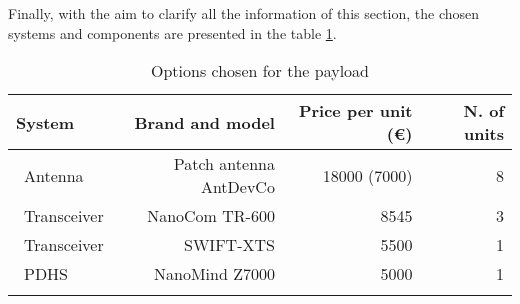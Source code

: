Finally, with the aim to clarify all the information of this section, the chosen systems and components are presented in the table \ref{payloadchosen}.

\begin{longtable}{| l | r | r | r |}
	\hline
	\rowcolor[gray]{0.80}	\textbf{System} &  \textbf{Brand and model}     & \textbf{Price per unit (\euro)} & \textbf{N. of units}  \\
	\hline
	\endfirsthead
	
	~Antenna & Patch antenna AntDevCo & 18000 (7000) & 8 \\
	~Transceiver & NanoCom TR-600 & 8545 & 3 \\
	~Transceiver& SWIFT-XTS & 5500 &1\\
	~PDHS & NanoMind Z7000 & 5000 & 1 \\
	\hline
	
\caption{Options chosen for the payload}
\label{payloadchosen}
\end{longtable}